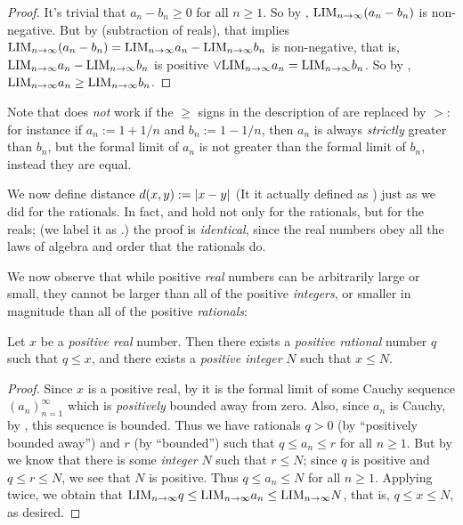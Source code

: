 \begin{proof}
It's trivial that \(a_n - b_n \ge 0\) for all \(n \ge 1\).
So by , \(\text{LIM}_{n \to \infty} (a_n - b_n)\) is non-negative.
But by  (subtraction of reals), that implies \(\text{LIM}_{n \to \infty} (a_n - b_n) = \text{LIM}_{n \to \infty} a_n - \text{LIM}_{n \to \infty} b_n\) is non-negative, that is, \(\text{LIM}_{n \to \infty} a_n - \text{LIM}_{n \to \infty} b_n\) is positive \(\lor \text{LIM}_{n \to \infty} a_n = \text{LIM}_{n \to \infty} b_n\).
So by , \(\text{LIM}_{n \to \infty} a_n \ge \text{LIM}_{n \to \infty} b_n\).
\end{proof}

\begin{remark} \label{remark 5.4.11}
Note that  does \emph{not} work if the \(\ge\) signs in the description of  are replaced by \(>\):
for instance if \(a_n := 1 + 1 / n\) and \(b_n := 1 - 1/n\), then \(a_n\) is always \emph{strictly} greater than \(b_n\), but the formal limit of \(a_n\) is not greater than the formal limit of \(b_n\), instead they are equal.
\end{remark}

\begin{note}
We now define distance \(d(x, y) := \lvert x - y\rvert\) (It it actually defined as ) just as we did for the rationals.
In fact,  and  hold not only for the rationals, but for the reals; (we label it as .)
the proof is \emph{identical}, since the real numbers obey all the laws of algebra and order that the rationals do.
\end{note}

We now observe that while positive \emph{real} numbers can be arbitrarily large or small,
they cannot be larger than all of the positive \emph{integers}, 
or smaller in magnitude than all of the positive \emph{rationals}:
\begin{proposition}  \label{prop 5.4.12}
Let \(x\) be a \emph{positive real} number.
Then there exists a \emph{positive rational} number \(q\) such that \(q \le x\),
and there exists a \emph{positive integer} \(N\) such that \(x \le N\).
\end{proposition}

\begin{proof}
Since \(x\) is a positive real, by  it is the formal limit of some Cauchy sequence \((a_n)_{n = 1}^{\infty}\) which is \emph{positively} bounded away from zero.
Also, since \(a_n\) is Cauchy, by , this sequence is bounded.
Thus we have rationals \(q > 0\) (by ``positively bounded away'') and \(r\) (by ``bounded'') such that \(q \le a_n \le r\) for all \(n \ge 1\).
But by  we know that there is some \emph{integer} \(N\) such that \(r \le N\);
since \(q\) is positive and \(q \le r \le N\), we see that \(N\) is positive.
Thus \(q \le a_n \le N\) for all \(n \ge 1\).
Applying  twice, we obtain that \(\text{LIM}_{n \to \infty} q \le \text{LIM}_{n \to \infty} a_n \le \text{LIM}_{n \to \infty} N\), that is, \(q \le x \le N\), as desired.
\end{proof}

